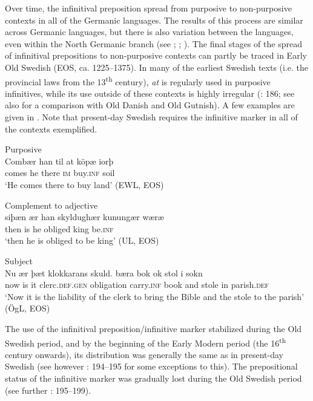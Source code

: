 \documentclass[output=paper]{langscibook}
\begin{document}
Over time, the infinitival preposition spread from purposive to non-purposive contexts in all of the Germanic languages. The results of this process are similar across Germanic languages, but there is also variation between the languages, even within the North Germanic branch (see \citealt{Haspelmath1989}; \citealt{Los2005}; \citealt{Kalm2016Prepositioner, Kalm2016Satsekvivalenta,Kalm2019}). The final stages of the spread of infinitival prepositions to non-purposive contexts can partly be traced in Early Old Swedish (EOS, ca. 1225–1375). In many of the earliest Swedish texts (i.e. the provincial laws from the 13\textsuperscript{th} century), \textit{at} is regularly used in purposive infinitives, while its use outside of these contexts is highly irregular (\citealt{Kalm2016Satsekvivalenta}: 186; see also \citealt{Kalm2019} for a comparison with Old Danish and Old Gutnish). A few examples are given in . Note that present-day Swedish requires the infinitive marker in all of the contexts exemplified. 


\ea
\label{ex:kalm:4}
\ea Purposive\\\label{ex:kalm:4a}
\gll Combær han til at köpæ iorþ\\ 
comes he there \textsc{im} buy.\textsc{inf} soil\\
\glt‘He comes there to buy land’ (EWL, EOS) 

\ex Complement to adjective\\\label{ex:kalm:4b}
\gll siþæn ær han skyldughær kunungær wæræ\\
 then is he obliged king be.\textsc{inf}\\
\glt ‘then he is obliged to be king’ (UL, EOS)
 
\ex Subject\\\label{ex:kalm:4c}
\gll Nu ær þæt klokkarans skuld. bæra bok ok stol i sokn\\
now is it clerc.\textsc{def.gen} obligation carry.\textsc{inf} book and stole in parish.\textsc{def}\\
\glt ‘Now it is the liability of the clerk to bring the Bible and the stole to the parish’ (ÖgL, EOS)

\z 
\z 



The use of the infinitival preposition/infinitive marker stabilized during the Old Swedish period, and by the beginning of the Early Modern period (the 16\textsuperscript{th} century onwards), its distribution was generally the same as in present-day Swedish (see however \citealt{Hellquist1902}: 194–195 for some exceptions to this). The prepositional status of the infinitive marker was gradually lost during the Old Swedish period (see further \citealt{Kalm2016Satsekvivalenta}: 195–199). 
\end{document}
